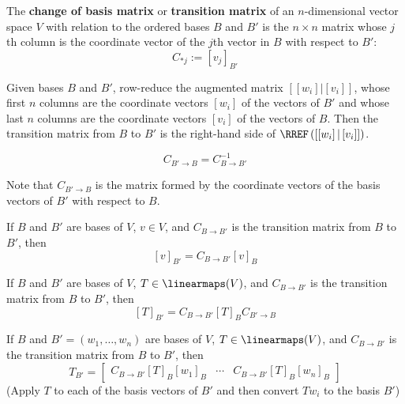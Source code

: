 \begin{definition}
  The \textbf{change of basis matrix} or \textbf{transition matrix} of an $n$-dimensional vector space $V$ with relation to the ordered bases $B$ and $B'$ is the $n \times n$ matrix whose $j$th column is the coordinate vector of the $j$th vector in $B$ with respect to $B'$:
  \[
    C_{*j} := [v_j]_{B'}
  \]
\end{definition}

\begin{procedure}
  Given bases $B$ and $B'$, row-reduce the augmented matrix $\left[\left[w_i\right] | \left[v_i\right]\right]$, whose first $n$ columns are the coordinate vectors $\left[w_i\right]$ of the vectors of $B'$ and whose last $n$ columns are the coordinate vectors $\left[v_i\right]$ of the vectors of $B$. Then the transition matrix from $B$ to $B'$ is the right-hand side of $\RREF \left(\left[\left[w_i\right] | \left[v_i\right]\right] \right)$.
\end{procedure}

\begin{lemma}
  \[
    C_{B' \to B} = C_{B \to B'}^{-1}
  \]

  Note that $C_{B' \to B}$ is the matrix formed by the coordinate vectors of the basis vectors of $B'$ with respect to $B$.
\end{lemma}

\begin{lemma}
  If $B$ and $B'$ are bases of $V$, $v \in V$, and $C_{B \to B'}$ is the transition matrix from $B$ to $B'$, then
  \[
    [v]_{B'} = C_{B \to B'} [v]_{B}
  \]
\end{lemma}

\begin{lemma}
  If $B$ and $B'$ are bases of $V$, $T \in \linearmaps(V)$, and $C_{B \to B'}$ is the transition matrix from $B$ to $B'$, then
  \[
    [T]_{B'} = C_{B \to B'} [T]_B C_{B' \to B}
  \]
\end{lemma}

\begin{procedure}
  If $B$ and $B' = (w_1, \ldots, w_n)$ are bases of $V$, $T \in \linearmaps(V)$, and $C_{B \to B'}$ is the transition matrix from $B$ to $B'$, then
  \[
    T_{B'} = 
    \begin{bmatrix}
      C_{B \to B'} [T]_B [w_1]_B & \cdots & C_{B \to B'} [T]_B [w_n]_B
    \end{bmatrix}
  \]
  (Apply $T$ to each of the basis vectors of $B'$ and then convert $Tw_i$ to the basis $B'$)
\end{procedure}

